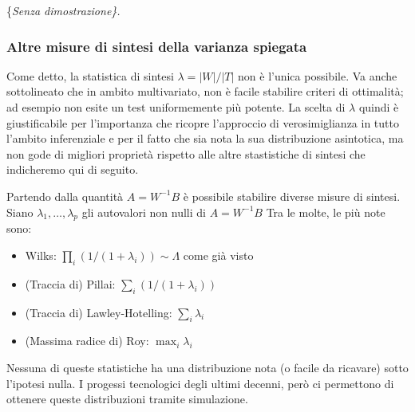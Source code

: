 \documentclass[]{article}
\begin{document}
\{\em Senza dimostrazione\}.

\subsubsection*{Altre misure di sintesi della varianza spiegata}

Come detto, la statistica di sintesi \(\lambda=|W|/|T|\) non è l'unica
possibile. Va anche sottolineato che in ambito multivariato, non è
facile stabilire criteri di ottimalità; ad esempio non esite un test
uniformemente più potente. La scelta di \(\lambda\) quindi è
giustificabile per l'importanza che ricopre l'approccio di
verosimiglianza in tutto l'ambito inferenziale e per il fatto che sia
nota la sua distribuzione asintotica, ma non gode di migliori proprietà
rispetto alle altre stastistiche di sintesi che indicheremo qui di
seguito.

Partendo dalla quantità \(A=W^{-1}B\) è possibile stabilire diverse
misure di sintesi. Siano \(\lambda_1, \ldots,\lambda_p\) gli autovalori
non nulli di \(A=W^{-1}B\) Tra le molte, le più note sono:

\begin{itemize}
\item Wilks: $\prod_i (1/(1+\lambda_i))\sim \Lambda$ come già visto
\item (Traccia di) Pillai: $\sum_i (1/(1+\lambda_i))$
\item (Traccia di) Lawley-Hotelling: $\sum_i \lambda_i$
\item (Massima radice di) Roy: $\max_i \lambda_i$
\end{itemize}

Nessuna di queste statistiche ha una distribuzione nota (o facile da
ricavare) sotto l'ipotesi nulla. I progessi tecnologici degli ultimi
decenni, però ci permettono di ottenere queste distribuzioni tramite
simulazione.
\end{document}
